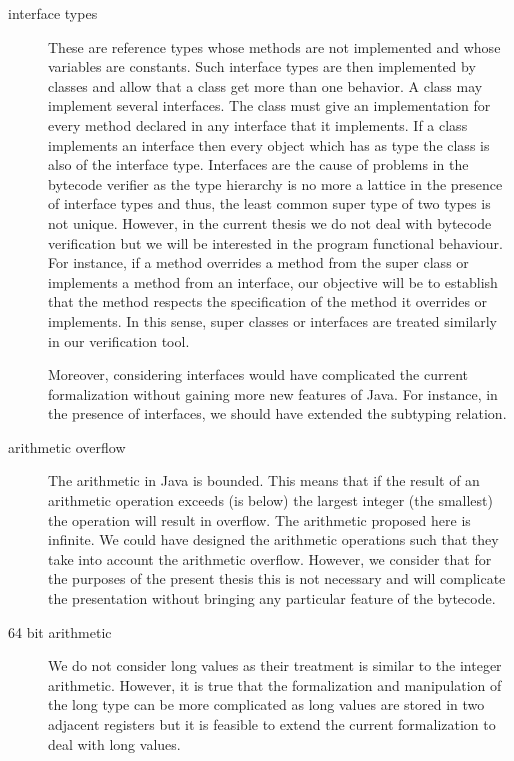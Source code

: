 \begin{description}
   \item [interface types] These are reference types whose methods are not implemented and whose variables are constants.
         Such interface types are then implemented by classes and allow that a class get more than one behavior.
	 A class may implement several interfaces. 
	 The class must give an implementation for every method declared in any interface that it implements.
	 If a class implements an interface then every object which has as type the class is also of the interface type.
	 Interfaces  are the cause of  problems in the bytecode verifier as the type hierarchy is no more a lattice in the 
	 presence of interface types and thus,
	 the least common super type of two types is not unique.
	 However, in the current thesis we do not deal with bytecode verification but 
	 we will be interested in the program functional behaviour. For instance, if a method overrides a method
	 from the super class or implements a method from an interface, our objective will be to establish that the method
	 respects the specification of the method it overrides or implements. In this sense, super classes or interfaces
	 are treated similarly in our verification tool.
  
	 Moreover, considering interfaces would have complicated the current formalization 
	 without gaining more new features of Java. 
	 For instance, in the presence of interfaces, we should have extended 
	 the subtyping relation. 

   \item [arithmetic overflow] The arithmetic in Java is  bounded. This means that if the result of an 
         arithmetic operation exceeds (is below) the largest integer (the smallest)  the operation will
	 result in overflow. The arithmetic proposed here is infinite. We could have designed the arithmetic
	 operations such that they take into account the arithmetic overflow. 
	 However, we consider that for the purposes of the present thesis this is not necessary and will 
	 complicate the presentation without bringing any particular feature of the bytecode. 
	 

   \item [64 bit arithmetic]  We do not consider  
	  long values as their treatment is similar to the integer arithmetic.
	  However, it is true that the formalization and manipulation of the long type can be more complicated as
	  long values are stored in two adjacent registers but it is feasible to extend the current formalization 
	  to deal with long values.


\end{description}
